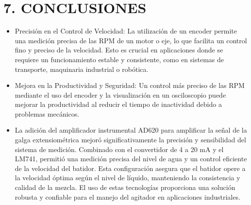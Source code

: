 \documentclass[esp]{ECCI-SIME-class}
\begin{document}
\section{7.	CONCLUSIONES}
\begin{itemize}
\item 
Precisión en el Control de Velocidad: La utilización de un encoder permite una medición precisa de las RPM de un motor o eje, lo que facilita un control fino y preciso de la velocidad. Esto es crucial en aplicaciones donde se requiere un funcionamiento estable y consistente, como en sistemas de transporte, maquinaria industrial o robótica.
\end{itemize}
\begin{itemize}
\item 
Mejora en la Productividad y Seguridad: Un control más preciso de las RPM mediante el uso del encoder y la visualización en un osciloscopio puede mejorar la productividad al reducir el tiempo de inactividad debido a problemas mecánicos.
\end{itemize}
\begin{itemize}
\item 
La adición del amplificador instrumental AD620 para amplificar la señal de la galga extensiométrica mejoró significativamente la precisión y sensibilidad del sistema de medición. Combinado con el convertidor de 4 a 20 mA y el LM741, permitió una medición precisa del nivel de agua y un control eficiente de la velocidad del batidor. Esta configuración asegura que el batidor opere a la velocidad óptima según el nivel de líquido, manteniendo la consistencia y calidad de la mezcla. El uso de estas tecnologías proporciona una solución robusta y confiable para el manejo del agitador en aplicaciones industriales.

\end{itemize}
\nocite{*}
\printbibliography
\end{document}
